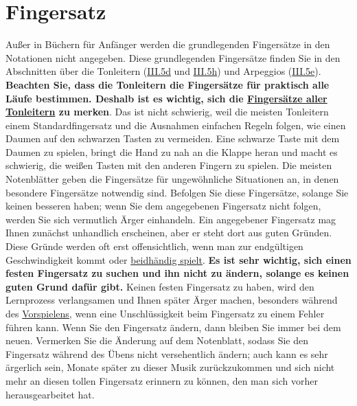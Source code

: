 
\section{Fingersatz}\hypertarget{c1ii18}{}

Außer in Büchern für Anfänger werden die grundlegenden Fingersätze in den Notationen nicht angegeben.
Diese grundlegenden Fingersätze finden Sie in den Abschnitten über die Tonleitern (\hyperlink{c1iii5d}{III.5d} und \hyperlink{c1iii5h}{III.5h}) und Arpeggios (\hyperlink{c1iii5e}{III.5e}).
\textbf{Beachten Sie, dass die Tonleitern die Fingersätze für praktisch alle Läufe bestimmen.
Deshalb ist es wichtig, sich die \hyperlink{table}{Fingersätze aller Tonleitern} zu merken}.
Das ist nicht schwierig, weil die meisten Tonleitern einem Standardfingersatz und die Ausnahmen einfachen Regeln folgen, wie einen Daumen auf den schwarzen Tasten zu vermeiden.
Eine schwarze Taste mit dem Daumen zu spielen, bringt die Hand zu nah an die Klappe heran und macht es schwierig, die weißen Tasten mit den anderen Fingern zu spielen.
Die meisten Notenblätter geben die Fingersätze für ungewöhnliche Situationen an, in denen besondere Fingersätze notwendig sind.
Befolgen Sie diese Fingersätze, solange Sie keinen besseren haben; wenn Sie dem angegebenen Fingersatz nicht folgen, werden Sie sich vermutlich Ärger einhandeln.
Ein angegebener Fingersatz mag Ihnen zunächst unhandlich erscheinen, aber er steht dort aus guten Gründen.
Diese Gründe werden oft erst offensichtlich, wenn man zur endgültigen Geschwindigkeit kommt oder \hyperlink{c1ii25}{beidhändig spielt}.
\textbf{Es ist sehr wichtig, sich einen festen Fingersatz zu suchen und ihn nicht zu ändern, solange es keinen guten Grund dafür gibt.}
Keinen festen Fingersatz zu haben, wird den Lernprozess verlangsamen und Ihnen später Ärger machen, besonders während des \hyperlink{c1iii14}{Vorspielens}, wenn eine Unschlüssigkeit beim Fingersatz zu einem Fehler führen kann.
Wenn Sie den Fingersatz ändern, dann bleiben Sie immer bei dem neuen.
Vermerken Sie die Änderung auf dem Notenblatt, sodass Sie den Fingersatz während des Übens nicht versehentlich ändern; auch kann es sehr ärgerlich sein, Monate später zu dieser Musik zurückzukommen und sich nicht mehr an diesen tollen Fingersatz erinnern zu können, den man sich vorher herausgearbeitet hat.

